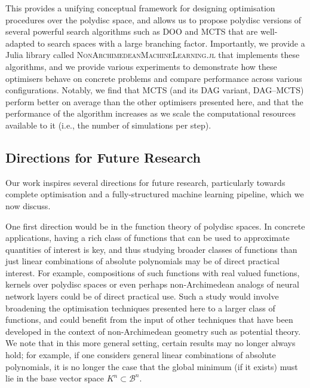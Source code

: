 \documentclass[10pt]{article}
\theoremstyle{definition}
\begin{document}
This provides a unifying conceptual framework for designing optimisation procedures over the polydisc space, and allows us to propose polydisc versions of several powerful search algorithms such as DOO and MCTS that are well-adapted to search spaces with a large branching factor.
Importantly, we provide a Julia library called \textsc{NonArchimedeanMachineLearning.jl} that implements these algorithms, and we provide various experiments to demonstrate how these optimisers behave on concrete problems and compare performance across various configurations. Notably, we find that MCTS (and its DAG variant, DAG--MCTS) perform better on average than the other optimisers presented here, and that the performance of the algorithm increases as we scale the computational resources available to it (i.e., the number of simulations per step).

\subsection{Directions for Future Research}

Our work inspires several directions for future research, particularly towards complete optimisation and a fully-structured machine learning pipeline, which we now discuss.

One first direction would be in the function theory of polydisc spaces.  In concrete applications, having a rich class of functions that can be used to approximate quantities of interest is key, and thus studying broader classes of functions than just linear combinations of absolute polynomials may be of direct practical interest.
For example, compositions of such functions with real valued functions, kernels over polydisc spaces or even perhaps non-Archimedean analogs of neural network layers could be of direct practical use. Such a study would involve broadening the optimisation techniques presented here to a larger class of functions, and could benefit from the input of other techniques that have been developed in the context of non-Archimedean geometry such as potential theory. We note that in this more general setting, certain results may no longer always hold; for example, if one considers general linear combinations of absolute polynomials, it is no longer the case that the global minimum (if it exists) must lie in the base vector space $K^n \subset \mathcal B ^ n$.
\end{document}
